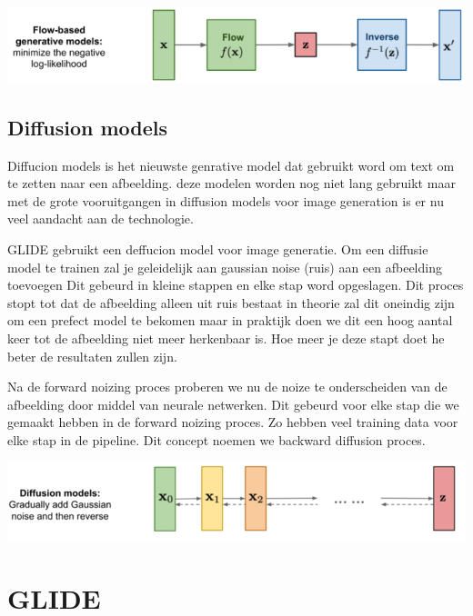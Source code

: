 \documentclass[12pt]{article}
\begin{document}
\begin{center}
    \includegraphics[width=1\columnwidth]{flow.png}
\end{center}

\subsection{Diffusion models}
Diffucion models is het nieuwste genrative model dat gebruikt word om text om te zetten naar een afbeelding.
deze modelen worden nog niet lang gebruikt maar met de grote vooruitgangen in diffusion models voor image generation
is er nu veel aandacht aan de technologie.

GLIDE gebruikt een deffucion model voor image generatie. Om een diffusie model te trainen zal je geleidelijk
aan gaussian noise (ruis) aan een afbeelding toevoegen Dit gebeurd in kleine stappen en elke stap word opgeslagen.
Dit proces stopt tot dat  de afbeelding alleen uit ruis bestaat in theorie zal dit oneindig zijn
om een prefect model te bekomen maar in praktijk doen we dit een hoog aantal keer tot de afbeelding
niet meer herkenbaar is. Hoe meer je deze stapt doet he beter de resultaten zullen zijn.

\bigskip
Na de forward noizing proces proberen we nu de noize te onderscheiden van de afbeelding door middel van 
neurale netwerken. Dit gebeurd voor elke stap die we gemaakt hebben in de forward noizing proces.
Zo hebben veel training data voor elke stap in de pipeline. Dit concept noemen we backward diffusion proces.
\autocite{Weng2021}


\begin{center}
    \includegraphics[width=1\columnwidth]{diffusion.png}
\end{center}

\section{GLIDE}
\end{document}
